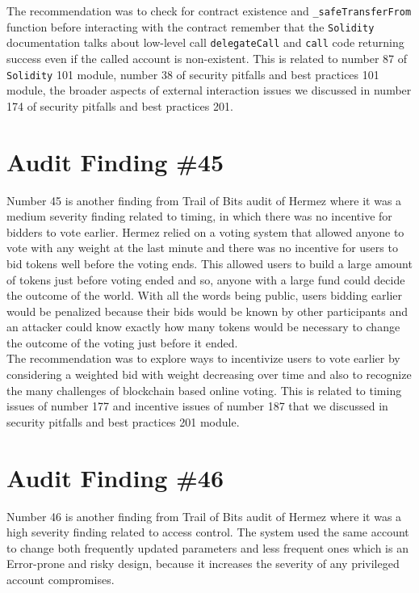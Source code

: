 The recommendation was to check for contract existence and \verb|_safeTransferFrom| function before interacting with the contract remember that the \verb|Solidity| documentation talks about low-level call \verb|delegateCall| and \verb|call| code returning success even if the called account is non-existent. This is related to number 87 of \verb|Solidity| 101 module, number 38 of security pitfalls and best practices 101 module, the broader aspects of external interaction issues we discussed in number 174 of security pitfalls and best practices 201.

\section{Audit Finding \#45}

Number 45 is another finding from Trail of Bits audit of Hermez where it was a medium severity finding related to timing, in which there was no incentive for bidders to vote earlier. Hermez relied on a voting system that allowed anyone to vote with any weight at the last minute and there was no incentive for users to bid tokens well before the voting ends. This allowed users to build a large amount of tokens just before voting ended and so, anyone with a large fund could decide the outcome of the world. With all the words being public, users bidding earlier would be penalized because their bids would be known by other participants and an attacker could know exactly how many tokens would be necessary to change the outcome of the voting just before it ended.\\

The recommendation was to explore ways to incentivize users to vote earlier by considering a weighted bid with weight decreasing over time and also to recognize the many challenges of blockchain based online voting. This is related to timing issues of number 177 and incentive issues of number 187 that we discussed in security pitfalls and best practices 201 module.

\section{Audit Finding \#46}

Number 46 is another finding from Trail of Bits audit of Hermez where it was a high severity finding related to access control. The system used the same account to change both frequently updated parameters and less frequent ones which is an Error-prone and risky design, because it increases the severity of any privileged account compromises.\\


